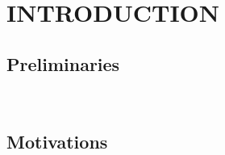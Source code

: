 \chapter{\uppercase{Introduction}} \label{chapter:01}

\section{Preliminaries}

\
\section{Motivations}